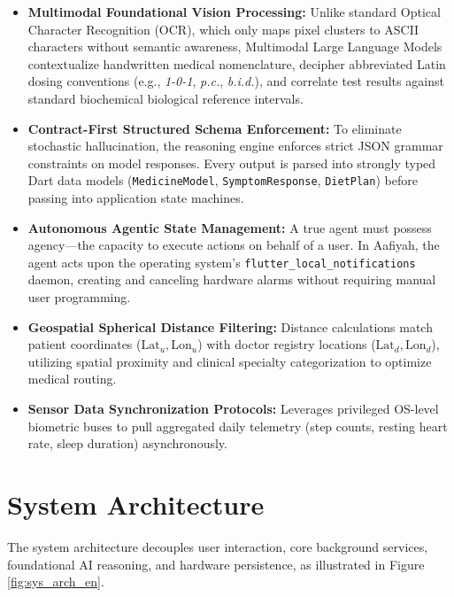 \documentclass[12pt,a4paper,oneside]{report}
\begin{document}
\begin{itemize}
    \item \textbf{Multimodal Foundational Vision Processing:} Unlike standard Optical Character Recognition (OCR), which only maps pixel clusters to ASCII characters without semantic awareness, Multimodal Large Language Models contextualize handwritten medical nomenclature, decipher abbreviated Latin dosing conventions (e.g., \textit{1-0-1}, \textit{p.c.}, \textit{b.i.d.}), and correlate test results against standard biochemical biological reference intervals.
    \item \textbf{Contract-First Structured Schema Enforcement:} To eliminate stochastic hallucination, the reasoning engine enforces strict JSON grammar constraints on model responses. Every output is parsed into strongly typed Dart data models (\texttt{MedicineModel}, \texttt{SymptomResponse}, \texttt{DietPlan}) before passing into application state machines.
    \item \textbf{Autonomous Agentic State Management:} A true agent must possess agency—the capacity to execute actions on behalf of a user. In Aafiyah, the agent acts upon the operating system's \texttt{flutter\_local\_notifications} daemon, creating and canceling hardware alarms without requiring manual user programming.
    \item \textbf{Geospatial Spherical Distance Filtering:} Distance calculations match patient coordinates ($\text{Lat}_u, \text{Lon}_u$) with doctor registry locations ($\text{Lat}_d, \text{Lon}_d$), utilizing spatial proximity and clinical specialty categorization to optimize medical routing.
    \item \textbf{Sensor Data Synchronization Protocols:} Leverages privileged OS-level biometric buses to pull aggregated daily telemetry (step counts, resting heart rate, sleep duration) asynchronously.
\end{itemize}

\chapter{System Architecture}

The system architecture decouples user interaction, core background services, foundational AI reasoning, and hardware persistence, as illustrated in Figure \ref{fig:sys_arch_en}.
\end{document}
